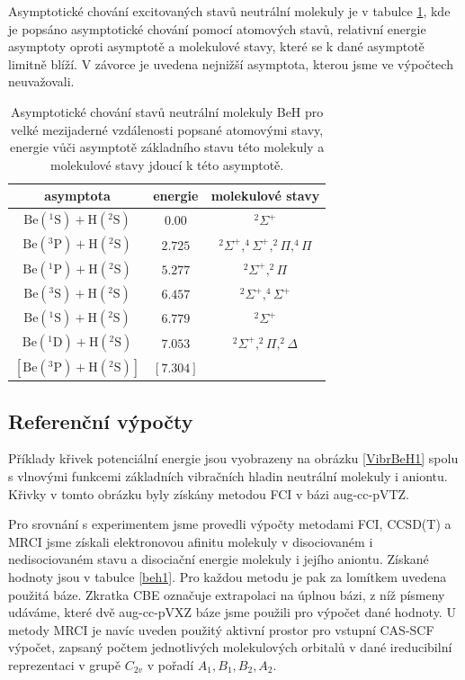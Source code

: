 Asymptotické chování excitovaných stavů neutrální molekuly je v tabulce \ref{taBeHas}, 
kde je popsáno asymptotické chování pomocí atomových stavů, relativní energie asymptoty 
oproti asymptotě a molekulové stavy, které se k dané asymptotě limitně blíží. V závorce 
je uvedena nejnižší asymptota, kterou jsme ve výpočtech neuvažovali.

\begin{table}
\centering
\caption{Asymptotické chování stavů neutrální molekuly BeH pro velké mezijaderné 
vzdálenosti popsané atomovými stavy, energie vůči asymptotě základního stavu této 
molekuly a molekulové stavy jdoucí k této asymptotě.}
\bigskip
\label{taBeHas}
\begin{tabular}{ccc}
\toprule
asymptota & energie & molekulové stavy \\ 
\midrule
$\mathrm{Be}(^1\mathrm{S}) + \mathrm{H}(^2\mathrm{S})$ & $0.00$ & $^2\Sigma^+$ \\ 
$\mathrm{Be}(^3\mathrm{P}) + \mathrm{H}(^2\mathrm{S})$ & $2.725$ & $^2\Sigma^+,^4\Sigma^+,^2\Pi,^4\Pi$ \\
$\mathrm{Be}(^1\mathrm{P}) + \mathrm{H}(^2\mathrm{S})$ & $5.277$ & $^2\Sigma^+,^2\Pi$ \\ 
$\mathrm{Be}(^3\mathrm{S}) + \mathrm{H}(^2\mathrm{S})$ & $6.457$ & $^2\Sigma^+,^4\Sigma^+$ \\
$\mathrm{Be}(^1\mathrm{S}) + \mathrm{H}(^2\mathrm{S})$ & $6.779$ & $^2\Sigma^+$ \\
$\mathrm{Be}(^1\mathrm{D}) + \mathrm{H}(^2\mathrm{S})$ & $7.053$ & $^2\Sigma^+,^2\Pi,^2\Delta$ \\
$\left[\mathrm{Be}(^3\mathrm{P}) + \mathrm{H}(^2\mathrm{S})\right]$ &$[7.304]$& \\
\bottomrule
\end{tabular}
\end{table}


\subsection{Referenční výpočty}
Příklady křivek potenciální energie jsou vyobrazeny na obrázku  
\ref{VibrBeH1} spolu s vlnovými funkcemi základních vibračních hladin neutrální 
molekuly i aniontu.
Křivky v tomto obrázku byly získány metodou FCI v bázi aug-cc-pVTZ.

Pro srovnání s experimentem jsme provedli výpočty metodami FCI, CCSD(T) a MRCI jsme  
získali elektronovou afinitu molekuly v disociovaném i nedisociovaném 
stavu a disociační energie molekuly i jejího aniontu. Získané hodnoty jsou v tabulce \ref{beh1}. Pro každou metodu je pak za lomítkem 
uvedena použitá báze. Zkratka CBE označuje extrapolaci na úplnou bázi, z níž písmeny udáváme, které dvě aug-cc-pVXZ báze jsme použili pro výpočet dané hodnoty. U metody MRCI je navíc uveden použitý aktivní prostor
pro vstupní CAS-SCF výpočet,
zapsaný počtem jednotlivých molekulových orbitalů v dané ireducibilní reprezentaci v 
grupě $C_{2v}$ v pořadí $A_1, B_1, B_2, A_2$. 

